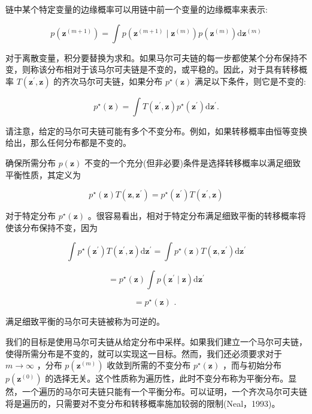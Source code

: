 \documentclass[10pt]{report}
\begin{document}
链中某个特定变量的边缘概率可以用链中前一个变量的边缘概率来表示:

\[
p\left( {\mathbf{z}}^{\left( m + 1\right) }\right)  = \int p\left( {{\mathbf{z}}^{\left( m + 1\right) } \mid  {\mathbf{z}}^{\left( m\right) }}\right) p\left( {\mathbf{z}}^{\left( m\right) }\right) \mathrm{d}{\mathbf{z}}^{\left( m\right) } \tag{14.32}
\]

对于离散变量，积分要替换为求和。如果马尔可夫链的每一步都使某个分布保持不变，则称该分布相对于该马尔可夫链是不变的，或平稳的。因此，对于具有转移概率 \(T\left( {{\mathbf{z}}^{\prime },\mathbf{z}}\right)\) 的齐次马尔可夫链，如果分布 \({p}^{ \star  }\left( \mathbf{z}\right)\) 满足以下条件，则它是不变的:

\[
{p}^{ \star  }\left( \mathbf{z}\right)  = \int T\left( {{\mathbf{z}}^{\prime },\mathbf{z}}\right) {p}^{ \star  }\left( {\mathbf{z}}^{\prime }\right) \mathrm{d}{\mathbf{z}}^{\prime }. \tag{14.33}
\]

请注意，给定的马尔可夫链可能有多个不变分布。例如，如果转移概率由恒等变换给出，那么任何分布都是不变的。

确保所需分布 \(p\left( \mathbf{z}\right)\) 不变的一个充分(但非必要)条件是选择转移概率以满足细致平衡性质，其定义为

\[
{p}^{ \star  }\left( \mathbf{z}\right) T\left( {\mathbf{z},{\mathbf{z}}^{\prime }}\right)  = {p}^{ \star  }\left( {\mathbf{z}}^{\prime }\right) T\left( {{\mathbf{z}}^{\prime },\mathbf{z}}\right)  \tag{14.34}
\]

对于特定分布 \({p}^{ \star  }\left( \mathbf{z}\right)\) 。很容易看出，相对于特定分布满足细致平衡的转移概率将使该分布保持不变，因为

\[
\int {p}^{ \star  }\left( {\mathbf{z}}^{\prime }\right) T\left( {{\mathbf{z}}^{\prime },\mathbf{z}}\right) \mathrm{d}{\mathbf{z}}^{\prime } = \int {p}^{ \star  }\left( \mathbf{z}\right) T\left( {\mathbf{z},{\mathbf{z}}^{\prime }}\right) \mathrm{d}{\mathbf{z}}^{\prime } \tag{14.35}
\]

\[
= {p}^{ \star  }\left( \mathbf{z}\right) \int p\left( {{\mathbf{z}}^{\prime } \mid  \mathbf{z}}\right) \mathrm{d}{\mathbf{z}}^{\prime } \tag{14.36}
\]

\[
= {p}^{ \star  }\left( \mathbf{z}\right) \text{ . } \tag{14.37}
\]

满足细致平衡的马尔可夫链被称为可逆的。

我们的目标是使用马尔可夫链从给定分布中采样。如果我们建立一个马尔可夫链，使得所需分布是不变的，就可以实现这一目标。然而，我们还必须要求对于 \(m \rightarrow  \infty\) ，分布 \(p\left( {\mathbf{z}}^{\left( m\right) }\right)\) 收敛到所需的不变分布 \({p}^{ \star  }\left( \mathbf{z}\right)\) ，而与初始分布 \(p\left( {\mathbf{z}}^{\left( 0\right) }\right)\) 的选择无关。这个性质称为遍历性，此时不变分布称为平衡分布。显然，一个遍历的马尔可夫链只能有一个平衡分布。可以证明，一个齐次马尔可夫链将是遍历的，只需要对不变分布和转移概率施加较弱的限制(Neal，1993)。
\end{document}

